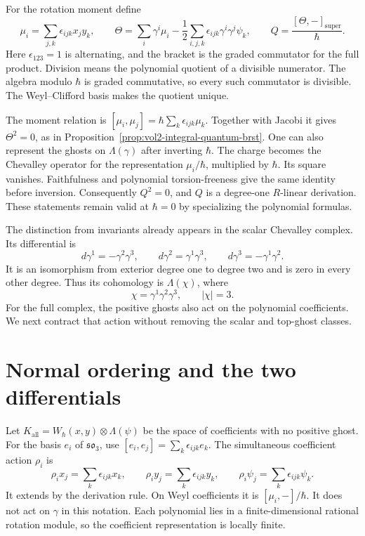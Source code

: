 For the rotation moment define
\begin{equation}\label{eq:vol2-absolute-brst-charge}
 \mu_i=\sum_{j,k}\epsilon_{ijk}x_jy_k,\qquad
 \Theta=\sum_i\gamma^i\mu_i
       -\frac12\sum_{i,j,k}\epsilon_{ijk}
                    \gamma^i\gamma^j\psi_k,
 \qquad Q=\frac{[\Theta,-]_{\mathrm{super}}}{\hbar}.
\end{equation}
Here $\epsilon_{123}=1$ is alternating, and the bracket is the
graded commutator for the full product.
Division means the polynomial quotient of a divisible numerator.
The algebra modulo $\hbar$ is graded commutative, so every such
commutator is divisible. The Weyl--Clifford basis makes the
quotient unique.

The moment relation is
$[\mu_i,\mu_j]=\hbar\sum_k\epsilon_{ijk}\mu_k$.
Together with Jacobi it gives $\Theta^2=0$, as in
Proposition~\ref{prop:vol2-integral-quantum-brst}.
One can also represent the ghosts on $\Lambda(\gamma)$ after
inverting $\hbar$. The charge becomes the Chevalley operator
for the representation $\mu_i/\hbar$, multiplied by $\hbar$.
Its square vanishes. Faithfulness and polynomial torsion-freeness
give the same identity before inversion.
Consequently $Q^2=0$, and $Q$ is a degree-one $R$-linear
derivation. These statements remain valid at $\hbar=0$ by
specializing the polynomial formulas.

The distinction from invariants already appears in the scalar
Chevalley complex. Its differential is
\begin{equation}\label{eq:vol2-scalar-ghost-differential}
 d\gamma^1=-\gamma^2\gamma^3,\qquad
 d\gamma^2=\gamma^1\gamma^3,\qquad
 d\gamma^3=-\gamma^1\gamma^2.
\end{equation}
It is an isomorphism from exterior degree one to degree two
and is zero in every other degree. Thus its cohomology is
$\Lambda(\chi)$, where
\[
 \chi=\gamma^1\gamma^2\gamma^3,\qquad |\chi|=3.
\]
For the full complex, the positive ghosts also act on the
polynomial coefficients. We next contract that action without
removing the scalar and top-ghost classes.

\section{Normal ordering and the two differentials}
\label{sec:vol2-absolute-normal-order}

Let
$K_{\mathrm{all}}=W_\hbar(x,y)\otimes\Lambda(\psi)$
be the space of coefficients with no positive ghost.
For the basis $e_i$ of $\mathfrak{so}_3$, use
$[e_i,e_j]=\sum_k\epsilon_{ijk}e_k$.
The simultaneous coefficient action $\rho_i$ is
\begin{equation}\label{eq:vol2-absolute-coefficient-action}
 \rho_i x_j=\sum_k\epsilon_{ijk}x_k,
 \qquad \rho_i y_j=\sum_k\epsilon_{ijk}y_k,
 \qquad \rho_i\psi_j=\sum_k\epsilon_{ijk}\psi_k.
\end{equation}
It extends by the derivation rule. On Weyl coefficients it is
$[\mu_i,-]/\hbar$. It does not act on $\gamma$ in this notation.
Each polynomial lies in a finite-dimensional rational rotation
module, so the coefficient representation is locally finite.

